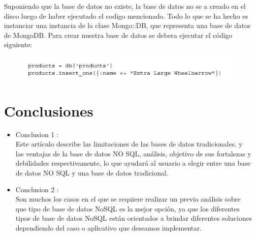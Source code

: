 \documentclass[preprint,12pt]{elsarticle}
\begin{document}
Suponiendo que la base de datos no existe, la base de datos no se a creado en el disco luego de haber ejecutado el codigo mencionado. Todo lo que se ha hecho es instanciar una instancia de la clase Mongo::DB, que representa una base de datos de MongoDB. Para crear nuestra base de datos se debera ejecutar el código siguiente:
\begin{figure}[htb]
	\begin{center}
		\includegraphics[width=15cm]{./IMAGENES/mongodb4} %
	\end{center}
\end{figure}
\cite{Raul2014}



\section{Conclusiones}

\begin{itemize}

\item Conclusion 1 : \\ Este artículo describe las limitaciones de las bases de datos tradicionales.
y las ventajas de la base de datos NO SQL, análisis, objetivo de sus fortalezas
y debilidades respectivamente, lo que ayudará al usuario a elegir
entre una base de datos NO SQL y una base de datos tradicional.

\item Conclusion 2 : \\ Son muchos los casos en el que se requiere realizar un previo análisis sobre que tipo de base de datos NoSQL es la mejor opción, ya que los diferentes tipos de base de datos NoSQL están orientados a brindar diferentes soluciones dependiendo del caso o aplicativo que deseamos implementar.


\end{itemize}


	
	\newpage
	
		 
	
	
\end{document}
